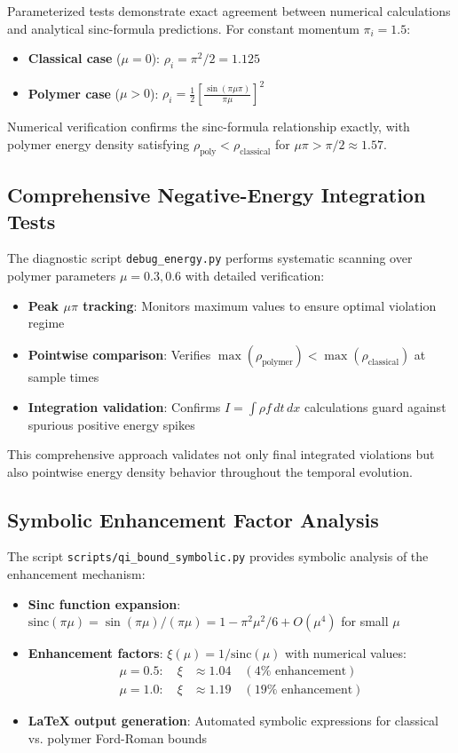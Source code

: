 \documentclass[12pt]{article}
\begin{document}
Parameterized tests demonstrate exact agreement between numerical calculations and analytical sinc-formula predictions. For constant momentum $\pi_i = 1.5$:
\begin{itemize}
\item \textbf{Classical case} ($\mu = 0$): $\rho_i = \pi^2/2 = 1.125$
\item \textbf{Polymer case} ($\mu > 0$): $\rho_i = \frac{1}{2}\left[\frac{\sin(\pi\mu\pi)}{\pi\mu}\right]^2$
\end{itemize}

Numerical verification confirms the sinc-formula relationship exactly, with polymer energy density satisfying $\rho_{\text{poly}} < \rho_{\text{classical}}$ for $\mu\pi > \pi/2 \approx 1.57$.

\subsection{Comprehensive Negative-Energy Integration Tests}

The diagnostic script \texttt{debug\_energy.py} performs systematic scanning over polymer parameters $\mu = 0.3, 0.6$ with detailed verification:
\begin{itemize}
\item \textbf{Peak $\mu\pi$ tracking}: Monitors maximum values to ensure optimal violation regime
\item \textbf{Pointwise comparison}: Verifies $\max(\rho_{\text{polymer}}) < \max(\rho_{\text{classical}})$ at sample times
\item \textbf{Integration validation}: Confirms $I = \int\rho f \, dt \, dx$ calculations guard against spurious positive energy spikes
\end{itemize}

This comprehensive approach validates not only final integrated violations but also pointwise energy density behavior throughout the temporal evolution.

\subsection{Symbolic Enhancement Factor Analysis}

The script \texttt{scripts/qi\_bound\_symbolic.py} provides symbolic analysis of the enhancement mechanism:
\begin{itemize}
\item \textbf{Sinc function expansion}: $\text{sinc}(\pi\mu) = \sin(\pi\mu)/(\pi\mu) = 1 - \pi^2\mu^2/6 + O(\mu^4)$ for small $\mu$
\item \textbf{Enhancement factors}: $\xi(\mu) = 1/\text{sinc}(\mu)$ with numerical values:
  \begin{align}
  \mu = 0.5: \quad \xi &\approx 1.04 \quad (4\% \text{ enhancement}) \\
  \mu = 1.0: \quad \xi &\approx 1.19 \quad (19\% \text{ enhancement})
  \end{align}
\item \textbf{LaTeX output generation}: Automated symbolic expressions for classical vs. polymer Ford-Roman bounds
\end{itemize}
\end{document}
